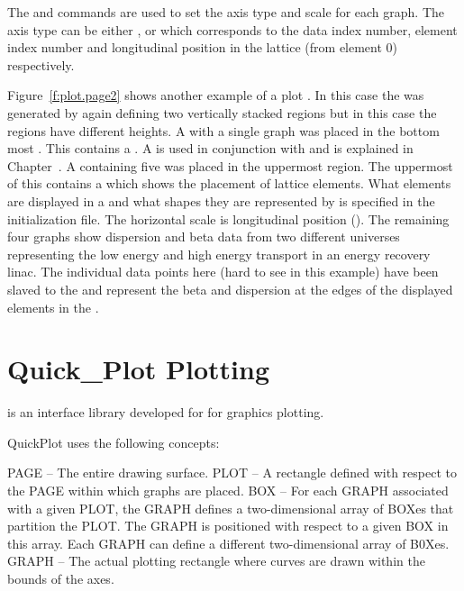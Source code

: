 The  and  commands are used to set the axis type and scale for each
graph. The axis type can be either ,  or  which corresponds
to the data index number, element index number and longitudinal position in the lattice
(from element 0) respectively.

Figure~\ref{f:plot.page2} shows another example of a plot .  In this case the
 was generated by again defining two vertically stacked regions but in this case
the regions have different heights.  A  with a single graph was placed
in the bottom most .  This  contains a .  A
 is used in conjunction with  and is explained in
Chapter~. A  containing five  was placed in
the uppermost region. The uppermost  of this  contains a
 which shows the placement of lattice elements.  What elements are
displayed in a  and what shapes they are represented by is specified in the
initialization file. The horizontal scale is longitudinal position ().  The
remaining four graphs show dispersion and beta data from two different universes
representing the low energy and high energy transport in an energy recovery linac. The
individual data points here (hard to see in this example) have been slaved to the
 and represent the beta and dispersion at the edges of the displayed
elements in the .

\section{Quick_Plot Plotting}
\label{s:quick.plot}

 is an interface library developed for \bmad for graphics plotting. 

QuickPlot uses
the following concepts:
\begin{example}
  PAGE  -- The entire drawing surface.
  PLOT  -- A rectangle defined with respect to the PAGE within which graphs are placed.
  BOX   -- For each GRAPH associated with a given PLOT, the GRAPH defines a two-dimensional array of BOXes that
            partition the PLOT. The GRAPH is positioned with respect to a given BOX in this array. 
            Each GRAPH can define a different two-dimensional array of B0Xes.
  GRAPH -- The actual plotting rectangle where curves are drawn within the bounds of the axes.
\end{example}

